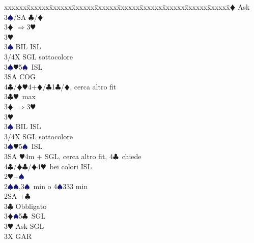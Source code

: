 \documentclass[a4paper,italian]{article}
\newcommand{\BC}{\textcolor{OliveGreen}{$\clubsuit$}}
\newcommand{\BD}{\textcolor{RedOrange}{$\vardiamondsuit$}}
\newcommand{\BH}{\textcolor{Red2}{$\varheartsuit${}}}
\newcommand{\BS}{\textcolor{MidnightBlue}{$\spadesuit${}}}
\newenvironment{bidtable}
{\begin{tabbing}

    xxxxxx\=xxxxxx\=xxxxxx\=xxxxxx\=xxxxxx\=xxxxxx\=xxxxxx\=xxxxxx\=xxxxxx\=xxxxxx\=\kill}
{\end{tabbing} }%
\begin{document}
\begin{multicols}{2}
\begin{bidtable}
                                            3\BD \> Ask\+\\
                                            3\BS/SA \> \BC /\BD \-\-\\
                                            3\BD \> $\Rightarrow$3\BH\+\\
                                            3\BH\+\\
                                            3\BS \> BIL ISL\\
                                            3/4X \> SGL sottocolore \-\-\\
                                            3\BS {}\BH 5\BS\ ISL\\
                                            3SA\> COG \\
                                            4\BC/\BD{}\BH4+\BD/\BC1\BC/\BD, cerca altro fit\-\\
                                            3\BC {}\BH\ max\+\\
                                            3\BD \> $\Rightarrow$3\BH\+\\
                                            3\BH\+\\
                                            3\BS \> BIL ISL\\
                                            3/4X \> SGL sottocolore \-\-\\
                                            3\BS {}\BH 5\BS\ ISL\\
                                            3SA \BH4m + SGL, cerca altro fit, 4\BC\ chiede\\
                                            4\BC/\BD {}\BC /\BD4\BH\ bei colori ISL\-\-\\
                                            2\BH {}+\BS \+\\
                                            2\BS {}\BS ,3\BS\ min o 4\BS 333 min\+\\
                                            2SA +\BC \+\\
                                            3\BC \> Obbligato\+\\
                                            3\BD {}\BS 5\BC\ SGL\+\\
                                            3\BH \> Ask SGL\-\\
                                            3X \> GAR\-\-\\

\end{bidtable}
\end{multicols}
\end{document}
